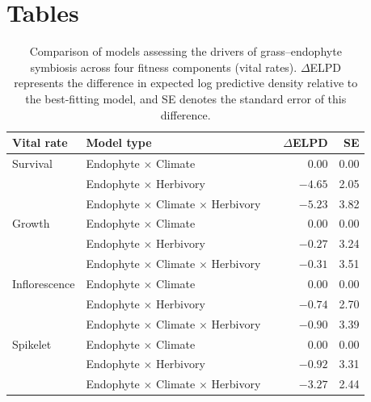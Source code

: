 \documentclass[12pt]{article}\usepackage[]{graphicx}\usepackage[dvipsnames]{xcolor}
\begin{document}
\clearpage

\section*{Tables}
{
\captionsetup[table]{list=no}

\begin{table}[h]
\centering
\caption{Comparison of models assessing the drivers of grass--endophyte symbiosis across four fitness components (vital rates). 
$\Delta$ELPD represents the difference in expected log predictive density relative to the best-fitting model, and SE denotes the standard error of this difference.}
\begin{tabular}{lllrr}
\toprule
\textbf{Vital rate} & \textbf{Model type} & & \textbf{$\Delta$ELPD} & \textbf{SE} \\
\midrule
Survival      & Endophyte $\times$ Climate                     & & 0.00   & 0.00 \\
              & Endophyte $\times$ Herbivory                   & & $-4.65$ & 2.05 \\
              & Endophyte $\times$ Climate $\times$ Herbivory  & & $-5.23$ & 3.82 \\
Growth        & Endophyte $\times$ Climate                     & & 0.00   & 0.00 \\
              & Endophyte $\times$ Herbivory                   & & $-0.27$ & 3.24 \\
              & Endophyte $\times$ Climate $\times$ Herbivory  & & $-0.31$ & 3.51 \\
Inflorescence & Endophyte $\times$ Climate                     & & 0.00   & 0.00 \\
              & Endophyte $\times$ Herbivory                   & & $-0.74$ & 2.70 \\
              & Endophyte $\times$ Climate $\times$ Herbivory  & & $-0.90$ & 3.39 \\
Spikelet      & Endophyte $\times$ Climate                     & & 0.00   & 0.00 \\
              & Endophyte $\times$ Herbivory                   & & $-0.92$ & 3.31 \\
              & Endophyte $\times$ Climate $\times$ Herbivory  & & $-3.27$ & 2.44 \\
\bottomrule
\end{tabular}
\label{tab:comp_table_driver}
\end{table}

\clearpage
\appendix

}
\end{document}
